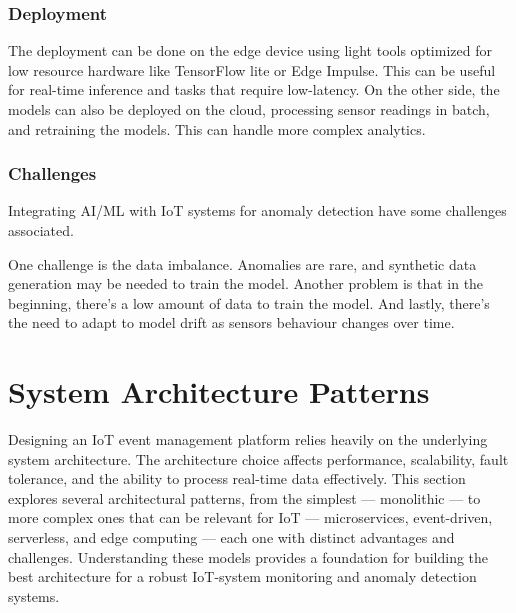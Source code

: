 \subsubsection{Deployment}

The deployment can be done on the edge device using light tools optimized for
low resource hardware like TensorFlow lite or Edge Impulse. This can be useful
for real-time inference and tasks that require low-latency.
On the other side, the models can also be deployed on the cloud, processing
sensor readings in batch, and retraining the models. This can handle more
complex analytics.

\subsubsection{Challenges}

Integrating \gls{AI}/\gls{ML} with \gls{IoT} systems for anomaly detection
have some challenges associated.

One challenge is the data imbalance.
Anomalies are rare, and synthetic data generation may be needed to train
the model.
Another problem is that in the beginning, there's a low amount of data to
train the model.
And lastly, there's the need to adapt to model drift as sensors behaviour
changes over time.

\section{System Architecture Patterns}
Designing an IoT event management platform relies heavily on the underlying
system architecture. The architecture choice affects performance, scalability,
fault tolerance, and the ability to process real-time data effectively. This
section explores several architectural patterns, from the simplest --- monolithic
--- to more complex ones that can be relevant for IoT --- microservices,
event-driven, serverless, and edge computing --- each one with distinct
advantages and challenges. Understanding these models provides a foundation for
building the best architecture for a robust IoT-system monitoring and anomaly
detection systems.

